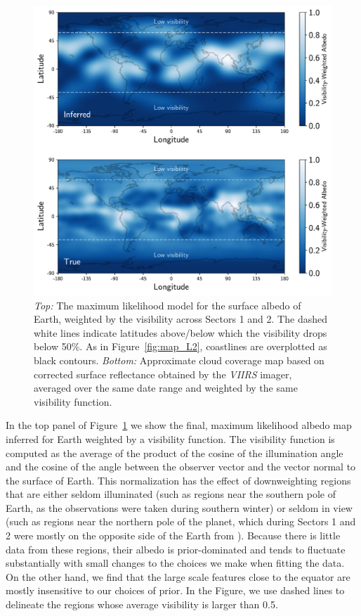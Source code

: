 \documentclass[modern]{aastex62}
\begin{document}
\begin{figure}[p!]
    \begin{centering}
    \includegraphics[width=\linewidth]{figures/map.pdf}
    \caption{\label{fig:map}
             \emph{Top:} The maximum likelihood model for the surface albedo
             of Earth, weighted by the visibility across Sectors 1 and 2. The
             dashed white lines indicate latitudes above/below which the
             visibility drops below 50\%. As in Figure~\ref{fig:map_L2}, coastlines 
             are overplotted as black contours.
             \emph{Bottom:} Approximate cloud coverage map based on corrected
             surface reflectance obtained by the
             \emph{VIIRS} imager, averaged over the same date range and weighted
             by the same visibility function.
             }
    \end{centering}
\end{figure}

In the top panel of Figure~\ref{fig:map} we show the final,
maximum likelihood albedo map inferred for Earth weighted by a visibility function.
The visibility function is computed as the average of the product of the 
cosine of the illumination angle and the cosine of the angle between the 
observer vector and the vector normal to the surface of Earth. This normalization
has the effect of downweighting regions that are either seldom illuminated (such
as regions near the southern pole of Earth, as the observations were taken during
southern winter) or seldom in view (such as regions near the northern pole of the planet,
which during Sectors 1 and 2 were mostly on the opposite side of the Earth from \TESS).
Because there is little data from these regions, their albedo is prior-dominated
and tends to fluctuate substantially with small changes to the choices we make
when fitting the data. On the other hand, we find that the large scale features close to
the equator are mostly insensitive to our choices of prior. In the Figure,
we use dashed lines to delineate the regions whose average visibility is larger
than 0.5.
\end{document}
